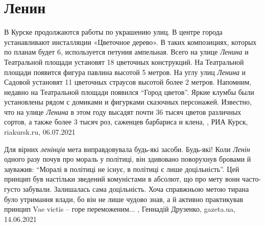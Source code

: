  
 
 
 
 
\chapter{Ленин}
\label{sec:slova.lenin}


В Курске продолжаются работы по украшению улиц. В центре города устанавливают
инсталляции «Цветочное дерево». В таких композициях, которых по планам будет 6,
используется петуния ампельная.  Всего на улице \emph{Ленина} и Театральной
площади установят 18 цветочных конструкций. На Театральной площади появится
фигура павлина высотой 5 метров. На углу улиц \emph{Ленина} и Садовой установят
11 цветочных страусов высотой более 2 метров.  Напомним, недавно на Театральной
площади появился \enquote{Город цветов}. Яркие клумбы были установлены рядом с
домиками и фигурками сказочных персонажей.  Известно, что на улице
\emph{Ленина} в этом году высадят почти 36 тысяч цветов различных сортов, а
также более 3 тысяч роз, саженцев барбариса и клена,
, РИА Курск, riakursk.ru, 06.07.2021

Для вірних \emph{ленінців} мета виправдовувала будь-які засоби. Будь-які! Коли \emph{Ленін}
одного разу почув про мораль у політиці, він здивовано поворухнув бровами й
зауважив: \enquote{Моралі в політиці не існує, в політиці є лише доцільність}. Цей
принцип був настільки зведений комуністами в абсолют, що про мету вони
часто-густо забували. Залишалась сама доцільність. Хоча справжньою метою тирана
було утримання влади, бо він не лише чудово знав, а й активно практикував
принцип Vae victis – горе переможеним...
, 
Геннадій Друзенко, gazeta.ua, 14.06.2021

